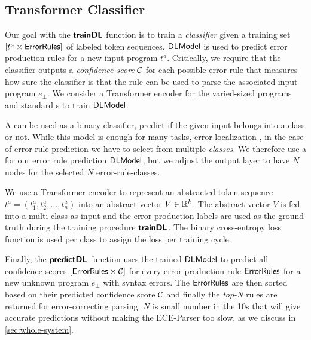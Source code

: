 \subsection{Transformer Classifier}
\label{sec:seq-classifiers:location-rank}

Our goal with the $\bm{\mathsf{trainDL}}$ function is to train a \emph{classifier} given a
training set $[t^a \times \mathsf{ErrorRules}]$ of labeled token sequences.
$\mathsf{DLModel}$ is used to predict error production rules for a new input program
$t^a$. Critically, we require that the classifier outputs a \emph{confidence
score} $\mathcal{C}$ for each possible error rule that measures how sure the
classifier is that the rule can be used to parse the associated input program
$e_{\bot}$. We consider a Transformer encoder for the varied-sized programs and
standard \dnn{}s to train $\mathsf{DLModel}$.

%
A \dnn can be used as a binary classifier, \ie predict if the given input
belongs into a class or not. While this model is enough for many tasks, \eg
error localization \citep{Sakkas_2020, Seidel:2017}, in the case of error rule
prediction we have to select from multiple \emph{classes}. We therefore use a
\dnn for our error rule prediction $\mathsf{DLModel}$, but we adjust the output layer to
have $N$ nodes for the selected $N$ error-rule-classes.

%
We use a Transformer encoder to represent an abstracted token sequence $t^a =
(t^a_1, t^a_2, \dots, t^a_n)$ into an abstract vector $V \in \mathbb{R}^k$. The abstract
vector $V$ is fed into a multi-class \dnn as input and the error production
labels are used as the ground truth during the training procedure $\bm{\mathsf{trainDL}}$.
The binary cross-entropy loss function is used per class to assign the loss per
training cycle.

Finally, the $\bm{\mathsf{predictDL}}$ function uses the trained $\mathsf{DLModel}$ to predict all
confidence scores $[\mathsf{ErrorRules} \times \mathcal{C}]$ for every error
production rule $\mathsf{ErrorRules}$ for a new unknown program $e_\bot$ with syntax
errors. The $\mathsf{ErrorRules}$ are then sorted based on their predicted confidence
score $\mathcal{C}$ and finally the \emph{top-N} rules are returned for
error-correcting parsing. $N$ is small number in the 10s that will give accurate
predictions without making the ECE-Parser too slow, as we discuss in
\autoref{sec:whole-system}.
